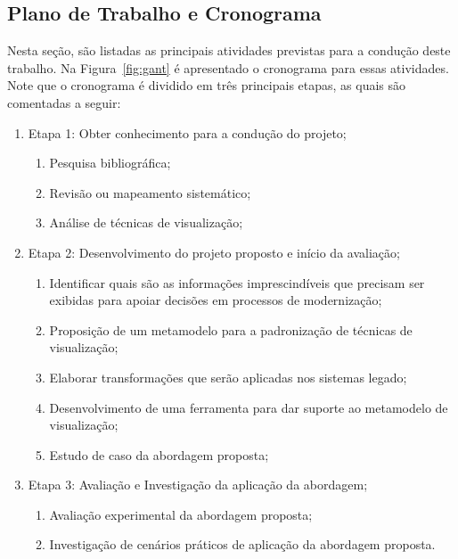 \documentclass[12pt]{article}
\begin{document}
\subsection{Plano de Trabalho e Cronograma}

Nesta seção, são listadas as principais atividades previstas para a condução deste trabalho. Na Figura~\ref{fig:gant} é apresentado o cronograma para essas atividades. Note que o cronograma é dividido em três principais etapas, as quais são comentadas a seguir:

\begin{enumerate}
\item Etapa 1: Obter conhecimento para a condução do projeto;
    
    \begin{enumerate}
    \item Pesquisa bibliográfica;
    \item Revisão ou mapeamento sistemático;
    \item Análise de técnicas de visualização;
    \end{enumerate}

\item Etapa 2: Desenvolvimento do projeto proposto e início da avaliação;

    \begin{enumerate}
    \item Identificar quais são as informações imprescindíveis que precisam ser exibidas para apoiar decisões em processos de modernização;
    \item Proposição de um metamodelo para a padronização de técnicas de visualização;
    \item Elaborar transformações que serão aplicadas nos sistemas legado;
    \item Desenvolvimento de uma ferramenta para dar suporte ao metamodelo de visualização;
    \item Estudo de caso da abordagem proposta;
    \end{enumerate}
    
\item Etapa 3: Avaliação e Investigação da aplicação da abordagem;

    \begin{enumerate}
    \item Avaliação experimental da abordagem proposta;
    \item Investigação de cenários práticos de aplicação da abordagem proposta.
    \end{enumerate}

\end{enumerate}
\end{document}
